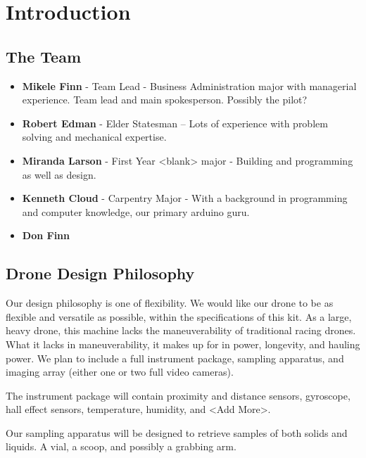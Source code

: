
\section{Introduction}

\subsection{The Team}
\begin{itemize}
    \item \textbf{Mikele Finn} - Team Lead - Business Administration major with managerial experience. Team lead and main spokesperson. Possibly the pilot?
    \item \textbf{Robert Edman} - Elder Statesman -- Lots of experience with problem solving and mechanical expertise.
    \item \textbf{Miranda Larson} - First Year <blank> major - Building and programming as well as design.
    \item \textbf{Kenneth Cloud} - Carpentry Major - With a background in programming and computer knowledge, our primary arduino guru.
    \item \textbf{Don Finn}
\end{itemize}


\subsection{Drone Design Philosophy}

Our design philosophy is one of flexibility. We would like our drone to be as flexible and versatile as possible, within the specifications of this kit. As a large, heavy drone, this machine lacks the maneuverability of traditional racing drones. What it lacks in maneuverability, it makes up for in power, longevity, and hauling power. We plan to include a full instrument package, sampling apparatus, and imaging array (either one or two full video cameras).

The instrument package will contain proximity and distance sensors, gyroscope, hall effect sensors, temperature, humidity, and <Add More>.

Our sampling apparatus will be designed to retrieve samples of both solids and liquids. A vial, a scoop, and possibly a grabbing arm.

